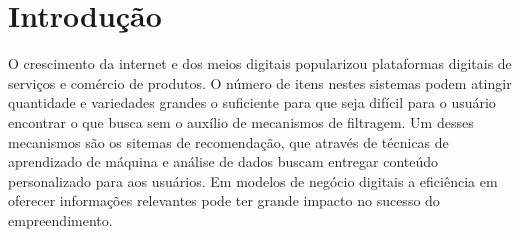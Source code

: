 \documentclass[
	12pt,				%
    oneside,			%
	a4paper,			%
	english,			%
	french,				%
	spanish,			%
	brazil,				%
	]{abntex2}
\begin{document}

\cleardoublepage %


\cleardoublepage




\tableofcontents*


\textual


\chapter{Introdução} %

O crescimento da internet e dos meios digitais popularizou plataformas digitais de serviços e comércio de produtos.
O número de itens nestes sistemas podem atingir quantidade e variedades grandes o suficiente para que seja difícil para o usuário 
encontrar o que busca sem o auxílio de mecanismos de filtragem. Um desses mecanismos são os sitemas de recomendação, que através de técnicas
de aprendizado de máquina e análise de dados buscam entregar conteúdo personalizado para aos usuários. Em modelos de negócio digitais a eficiência em 
oferecer informações relevantes pode ter grande impacto no sucesso do empreendimento.
\end{document}
